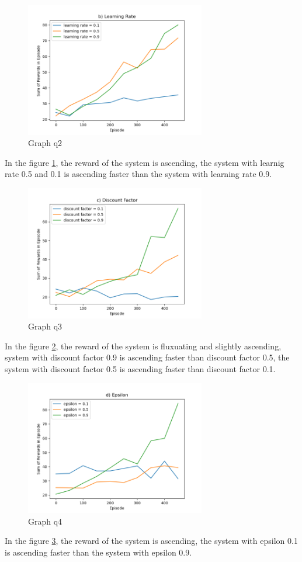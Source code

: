 \documentclass{article}
\begin{document}
\begin{figure}[h!]
    \centering
    \includegraphics[width=0.7\textwidth]{graph b.png}
    \caption{Graph q2}\label{fig:pb3graph2}
\end{figure}
In the figure \ref{fig:pb3graph2}, the reward of the system is ascending,
the system with learnig rate 0.5 and 0.1 is ascending faster than the system with
learning rate 0.9.

\begin{figure}[h!]
    \centering
    \includegraphics[width=0.7\textwidth]{graph c.png}
    \caption{Graph q3}\label{fig:pb3graph3}
\end{figure}
In the figure \ref{fig:pb3graph3}, the reward of the system is fluxuating and slightly ascending,
system with discount factor 0.9 is ascending faster than discount factor 0.5, the system with
discount factor 0.5 is ascending faster than discount factor 0.1.

\begin{figure}[h!]
    \centering
    \includegraphics[width=0.7\textwidth]{graph d.png}
    \caption{Graph q4}\label{fig:pb3graph4}
\end{figure}
In the figure \ref{fig:pb3graph4}, the reward of the system is ascending,
the system with epsilon 0.1 is ascending faster than the system with epsilon 0.9.
\end{document}
